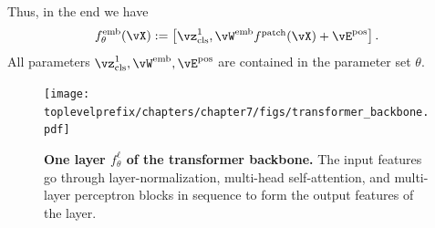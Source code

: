 \documentclass[../../book-main.tex]{subfiles}
\begin{document}
Thus, in the end we have 
\begin{equation}\label{eq:definition_of_embedding_module}
    f_{\theta}^{\emb}(\vX) := \mat{\vz_{\cls}^{1}, \vW^{\emb}f^{\patch}(\vX) + \vE^{\pos}}.
\end{equation}
All parameters \(\vz_{\cls}^{1}, \vW^{\emb}, \vE^{\pos}\) are contained in the parameter set \(\theta\).

\begin{figure}
    \centering 
    \texttt{[image: \\toplevelprefix/chapters/chapter7/figs/transformer\_backbone.pdf]}
    \caption{\small\textbf{One layer \(f_{\theta}^{\ell}\) of the transformer backbone.} The input features go through layer-normalization, multi-head self-attention, and multi-layer perceptron blocks in sequence to form the output features of the layer.}
    \label{fig:transformer_backbone}
\end{figure}
\end{document}
